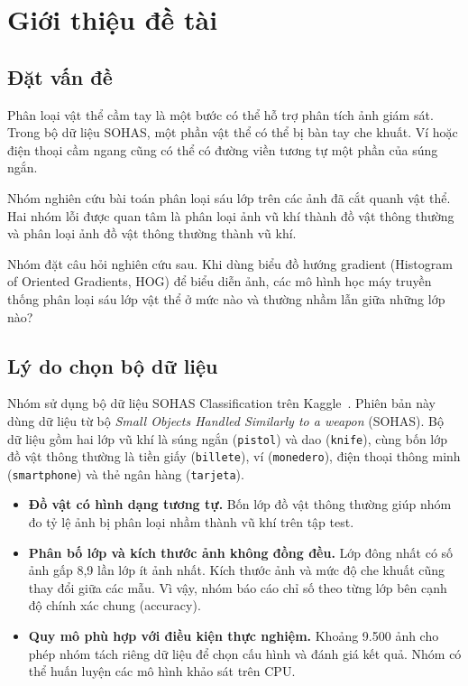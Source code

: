\section{Giới thiệu đề tài}
\label{sec:gioi_thieu}

\subsection{Đặt vấn đề}

Phân loại vật thể cầm tay là một bước có thể hỗ trợ phân tích ảnh giám sát. Trong bộ dữ liệu SOHAS, một phần vật thể có thể bị bàn tay che khuất. Ví hoặc điện thoại cầm ngang cũng có thể có đường viền tương tự một phần của súng ngắn.

Nhóm nghiên cứu bài toán phân loại sáu lớp trên các ảnh đã cắt quanh vật thể. Hai nhóm lỗi được quan tâm là phân loại ảnh vũ khí thành đồ vật thông thường và phân loại ảnh đồ vật thông thường thành vũ khí.

Nhóm đặt câu hỏi nghiên cứu sau. Khi dùng biểu đồ hướng gradient (Histogram of Oriented Gradients, HOG) để biểu diễn ảnh, các mô hình học máy truyền thống phân loại sáu lớp vật thể ở mức nào và thường nhầm lẫn giữa những lớp nào?

\subsection{Lý do chọn bộ dữ liệu}

Nhóm sử dụng bộ dữ liệu SOHAS Classification trên Kaggle~\cite{sohas_kaggle}. Phiên bản này dùng dữ liệu từ bộ \emph{Small Objects Handled Similarly to a weapon} (SOHAS). Bộ dữ liệu gồm hai lớp vũ khí là súng ngắn (\texttt{pistol}) và dao (\texttt{knife}), cùng bốn lớp đồ vật thông thường là tiền giấy (\texttt{billete}), ví (\texttt{monedero}), điện thoại thông minh (\texttt{smartphone}) và thẻ ngân hàng (\texttt{tarjeta}).

\begin{itemize}
  \item \textbf{Đồ vật có hình dạng tương tự.} Bốn lớp đồ vật thông thường giúp nhóm đo tỷ lệ ảnh bị phân loại nhầm thành vũ khí trên tập test.
  \item \textbf{Phân bố lớp và kích thước ảnh không đồng đều.} Lớp đông nhất có số ảnh gấp 8,9 lần lớp ít ảnh nhất. Kích thước ảnh và mức độ che khuất cũng thay đổi giữa các mẫu. Vì vậy, nhóm báo cáo chỉ số theo từng lớp bên cạnh độ chính xác chung (accuracy).
  \item \textbf{Quy mô phù hợp với điều kiện thực nghiệm.} Khoảng 9.500 ảnh cho phép nhóm tách riêng dữ liệu để chọn cấu hình và đánh giá kết quả. Nhóm có thể huấn luyện các mô hình khảo sát trên CPU.
\end{itemize}

